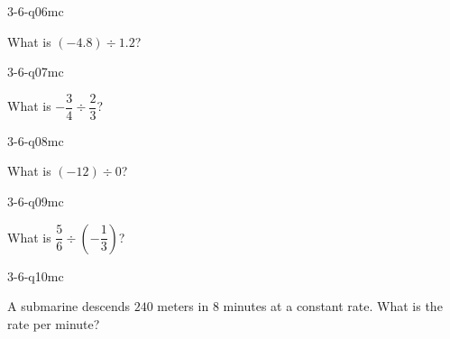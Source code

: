 \begin{practiceQuestion}{3-6-q06}{mc}
\begin{questionText}
What is $(-4.8) \div 1.2$?
\end{questionText}
\end{practiceQuestion}

\begin{practiceQuestion}{3-6-q07}{mc}
\begin{questionText}
What is $-\dfrac{3}{4} \div \dfrac{2}{3}$?
\end{questionText}
\end{practiceQuestion}

\begin{practiceQuestion}{3-6-q08}{mc}
\begin{questionText}
What is $(-12) \div 0$?
\end{questionText}
\end{practiceQuestion}

\begin{practiceQuestion}{3-6-q09}{mc}
\begin{questionText}
What is $\dfrac{5}{6} \div \left(-\dfrac{1}{3}\right)$?
\end{questionText}
\end{practiceQuestion}

\begin{practiceQuestion}{3-6-q10}{mc}
\begin{questionText}
A submarine descends $240$ meters in $8$ minutes at a constant rate. What is the rate per minute?
\end{questionText}
\end{practiceQuestion}

